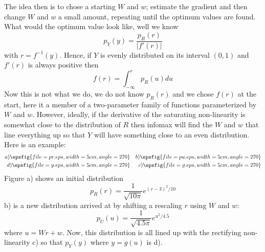 \documentclass[12pt]{article}
\begin{document}
The idea then is to chose a starting $W$ and $w$; estimate the
gradient and then change $W$ and $w$ a small amount, repeating until
the optimum values are found. What would the optimum value look like, well we know
\begin{equation}
p_Y(y)=\frac{p_R(r)}{|f'(r)|}
\end{equation}
with $r=f^{-1}(y)$. Hence, if $Y$ is evenly distributed on its interval $(0,1)$ and $f'(r)$ is always positive then
\begin{equation}
f(r)=\int_{-\infty}^rp_R(u)du
\end{equation}
Now this is not what we do, we do not know $p_R(r)$ and we chose
$f(r)$ at the start, here it a member of a two-parameter family of
functions parameterized by $W$ and $w$. However, ideally, if the
derivative of the saturating non-linearity is somewhat close to the
distribution of $R$ then infomax will find the $W$ and $w$ that line
everything up so that $Y$ will have something close to an even
distribution. Here is an example:
\begin{eqnarray}
a)\epsfig{file=pr.eps,width=5cm,angle=270}&&b)\epsfig{file=pu.eps,width=5cm,angle=270}\cr
d)\epsfig{file=y.eps,width=5cm,angle=270}&&c)\epsfig{file=g.eps,width=5cm,angle=270}
\end{eqnarray}
Figure a) shows an initial distribution 
\begin{equation}
p_R(r)=\frac{1}{\sqrt{10\pi}}e^{(r-3)^2/10}
\end{equation}
b) is a new distribution arrived at by shifting a rescaling $r$ using $W$ and $w$:
\begin{equation}
p_U(u)=\frac{1}{\sqrt{4.5\pi}}e^{u^2/4.5}
\end{equation}
where $u=Wr+w$. Now, this distribution is all lined up with the
rectifying non-linearity c) so that $p_Y(y)$ where $y=g(u)$ is d).
\end{document}
